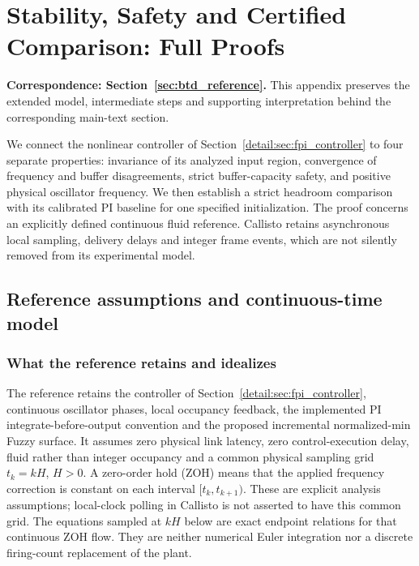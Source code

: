 \section{Stability, Safety and Certified Comparison: Full Proofs}
\label{app:theory}
\noindent\textbf{Correspondence: Section~\ref{sec:btd_reference}.} This appendix preserves the extended model, intermediate steps and supporting interpretation behind the corresponding main-text section.


\label{detail:sec:btd_reference}

We connect the nonlinear controller of Section~\ref{detail:sec:fpi_controller}
to four separate properties: invariance of its analyzed input region,
convergence of frequency and buffer disagreements, strict buffer-capacity
safety, and positive physical oscillator frequency. We then establish a
strict headroom comparison with its calibrated PI baseline for one
specified initialization. The proof concerns an explicitly defined
continuous fluid reference. Callisto retains asynchronous local
sampling, delivery delays and integer frame events, which are not
silently removed from its experimental model.

\subsection{Reference assumptions and continuous-time model}
\label{detail:subsec:btd_ref_model}

\subsubsection{What the reference retains and idealizes}
The reference retains the controller of Section~\ref{detail:sec:fpi_controller}, continuous oscillator phases, local occupancy
feedback, the implemented PI integrate-before-output convention and the proposed
incremental normalized-min Fuzzy surface. It assumes zero physical link latency,
zero control-execution delay, fluid rather than integer occupancy and a
common physical sampling grid $t_k=kH$, $H>0$. A zero-order hold (ZOH)
means that the applied frequency correction is constant on each interval
$[t_k,t_{k+1})$. These are explicit analysis assumptions; local-clock
polling in Callisto is not asserted to have this common grid.
The equations sampled at $kH$ below are exact endpoint relations for that
continuous ZOH flow. They are neither numerical Euler integration nor a
discrete firing-count replacement of the plant.

